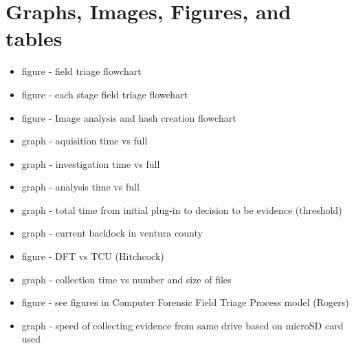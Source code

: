\documentclass[12pt]{article}
\begin{document}
\section{Graphs, Images, Figures, and tables}
\begin{itemize}
  \item figure - field triage flowchart
  \item figure - each stage field triage flowchart
  \item figure - Image analysis and hash creation flowchart
  \item graph - aquisition time vs full
  \item graph - investigation time vs full
  \item graph - analysis time vs full
  \item graph - total time from initial plug-in to decision to be evidence (threshold)
  \item graph - current backlock in ventura county
  \item figure - DFT vs TCU (Hitchcock\cite{hitchcock2016tiered})
  \item graph - collection time vs number and size of files
  \item figure - see figures in Computer Forensic Field Triage Process model (Rogers)
  \item graph - speed of collecting evidence from same drive based on microSD card used

\end{itemize}
\end{document}
